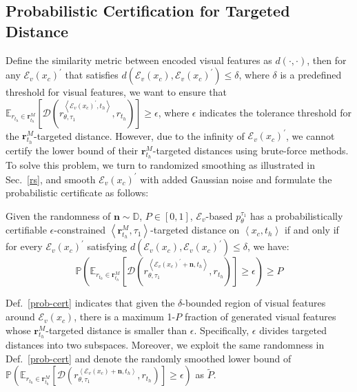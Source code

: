 \subsection{Probabilistic Certification for Targeted Distance}
Define the similarity metric between encoded visual features as $d(\cdot, \cdot)$,  then for any $\mathcal{E}_v(x_c)^{\prime}$ that satisfies $d(\mathcal{E}_v(x_c), \mathcal{E}_v(x_c)^{\prime})\leq\delta$, where $\delta$ is a predefined threshold for visual features, we want to ensure that    $\mathbb{E}_{r_{t_h}\in\mathbf{r}_{t_h}^{M}}[\mathcal{D}(r_{\theta, \tau_1}^{\left<\mathcal{E}_v(x_c)^{\prime}, t_h\right>}, r_{t_h})] \geq \epsilon$, where $\epsilon$ indicates the tolerance threshold for the $\mathbf{r}_{t_h}^{M}$-targeted distance.
However, due to the infinity of $\mathcal{E}_v(x_c)^{\prime}$, we cannot certify the lower bound of their $\mathbf{r}_{t_h}^{M}$-targeted distances using brute-force methods. To solve this problem, we turn to randomized smoothing as illustrated in Sec.~\ref{rs}, and smooth $\mathcal{E}_{v}(x_c)^{\prime}$ with added Gaussian noise and formulate the probabilistic certificate as follows: 
\begin{definition} 
\label{prob-cert}
Given the randomness of $\mathbf{n}\sim\mathbb{D}$, $P\in\left[0, 1\right]$,
$\mathcal{E}_v$-based $p_{\theta}^{\tau_1}$ has a probabilistically certifiable $\epsilon$-constrained $\left<\mathbf{r}_{t_h}^{M}, \tau_1\right>$-targeted distance on $\left<x_c, t_h\right>$ if and only if for every $\mathcal{E}_v(x_c)^{\prime}$ satisfying $d(\mathcal{E}_v(x_c), \mathcal{E}_v(x_c)^{\prime})\leq\delta$, we have:
\begin{equation}
\label{eq-prob-cert}
\mathbb{P}(\mathbb{E}_{r_{t_h}\in\mathbf{r}_{t_h}^M}[\mathcal{D}(r_{\theta, \tau_1}^{\left<\mathcal{E}_v(x_c)^{\prime}+\mathbf{n}, t_h\right>}, r_{t_h})]\geq\epsilon)\geq P
\end{equation}
\end{definition}
Def.~\ref{prob-cert} indicates that given the $\delta$-bounded region of visual features around $\mathcal{E}_v(x_c)$, there is a maximum 1-$P$ fraction of generated visual features whose $\mathbf{r}_{t_h}^{M}$-targeted distance is smaller than $\epsilon$. Specifically, $\epsilon$ divides targeted distances into two subspaces. Moreover, we exploit the same randomness in Def.~\ref{prob-cert} and denote the randomly smoothed lower bound of $\mathbb{P}(\mathbb{E}_{r_{t_h}\in\mathbf{r}_{t_h}^M}[\mathcal{D}(r_{\theta, \tau_1}^{\left<\mathcal{E}_v(x_c)+\mathbf{n}, t_h\right>}, r_{t_h})]\geq\epsilon)$ as $\tilde{P}$. 
